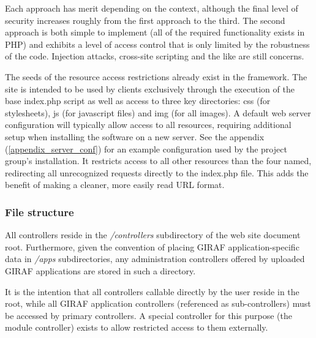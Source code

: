 Each approach has merit depending on the context, although the final level of security increases roughly from the first approach to the third. The second approach is both simple to implement (all of the required functionality exists in PHP) and exhibits a level of access control that is only limited by the robustness of the code. Injection attacks, cross-site scripting and the like are still concerns.

The seeds of the resource access restrictions already exist in the framework. The site is intended to be used by clients exclusively through the execution of the base index.php script as well as access to three key directories: css (for stylesheets), js (for javascript files) and img (for all images). A default web server configuration will typically allow access to all resources, requiring additional setup when installing the software on a new server. See the appendix (\vref{appendix_server_conf}) for an example configuration used by the project group's installation. It restricts access to all other resources than the four named, redirecting all unrecognized requests directly to the index.php file. This adds the benefit of making a cleaner, more easily read URL format.

\subsubsection*{File structure}
All controllers reside in the \emph{/controllers} subdirectory of the web site document root. Furthermore, given the convention of placing GIRAF application-specific data in \emph{/apps} subdirectories, any administration controllers offered by uploaded GIRAF applications are stored in such a directory.

It is the intention that all controllers callable directly by the user reside in the root, while all GIRAF application controllers (referenced as sub-controllers) must be accessed by primary controllers. A special controller for this purpose (the module controller) exists to allow restricted access to them externally.

